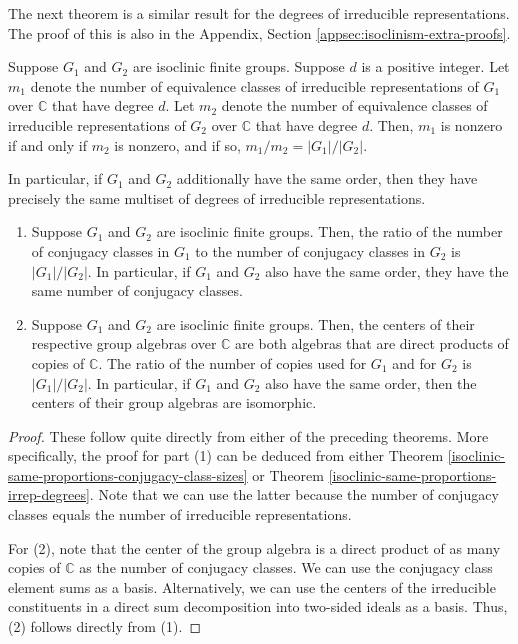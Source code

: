\documentclass{ucetd}
\begin{document}
The next theorem is a similar result for the degrees of irreducible
representations. The proof of this is also in the Appendix, Section
\ref{appsec:isoclinism-extra-proofs}.

\begin{theorem}\label{isoclinic-same-proportions-irrep-degrees}
  Suppose $G_1$ and $G_2$ are isoclinic finite groups. Suppose $d$ is
  a positive integer. Let $m_1$ denote the number of equivalence
  classes of irreducible representations of $G_1$ over $\mathbb{C}$
  that have degree $d$. Let $m_2$ denote the number of equivalence
  classes of irreducible representations of $G_2$ over $\mathbb{C}$
  that have degree $d$. Then, $m_1$ is nonzero if and only if $m_2$ is
  nonzero, and if so, $m_1/m_2 = |G_1|/|G_2|$.

  In particular, if $G_1$ and $G_2$ additionally have the same order,
  then they have precisely the same multiset of degrees of irreducible
  representations.
\end{theorem}

\begin{theorem}
  \begin{enumerate}
  \item Suppose $G_1$ and $G_2$ are isoclinic finite groups. Then, the
    ratio of the number of conjugacy classes in $G_1$ to the number of
    conjugacy classes in $G_2$ is $|G_1|/|G_2|$. In particular, if
    $G_1$ and $G_2$ also have the same order, they have the same
    number of conjugacy classes.
  \item Suppose $G_1$ and $G_2$ are isoclinic finite groups. Then, the
    centers of their respective group algebras over $\mathbb{C}$ are
    both algebras that are direct products of copies of
    $\mathbb{C}$. The ratio of the number of copies used for $G_1$ and
    for $G_2$ is $|G_1|/|G_2|$. In particular, if $G_1$ and $G_2$ also
    have the same order, then the centers of their group algebras are
    isomorphic.
  \end{enumerate}
\end{theorem}

\begin{proof}
  These follow quite directly from either of the preceding
  theorems. More specifically, the proof for part (1) can be deduced
  from either Theorem
  \ref{isoclinic-same-proportions-conjugacy-class-sizes} or Theorem
  \ref{isoclinic-same-proportions-irrep-degrees}. Note that we can use
  the latter because the number of conjugacy classes equals the number
  of irreducible representations.

  For (2), note that the center of the group algebra is a direct
  product of as many copies of $\mathbb{C}$ as the number of conjugacy
  classes. We can use the conjugacy class element sums as a
  basis. Alternatively, we can use the centers of the irreducible
  constituents in a direct sum decomposition into two-sided ideals as
  a basis. Thus, (2) follows directly from (1).
\end{proof}
\end{document}
